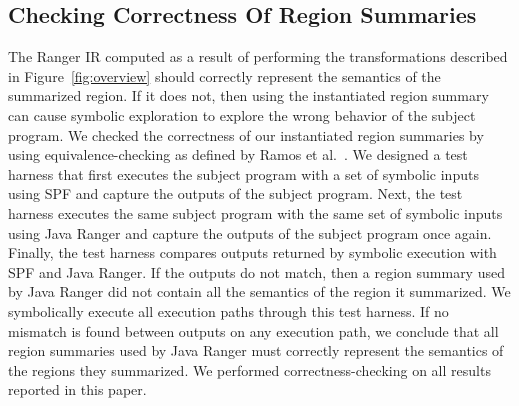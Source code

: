 \subsection{Checking Correctness Of Region Summaries}
The Ranger IR computed as a result of performing the transformations described in Figure~\ref{fig:overview} should
correctly represent the semantics of the summarized region.
%
If it does not, then using the instantiated region summary can cause symbolic exploration to explore the wrong behavior
of the subject program.
%
We checked the correctness of our instantiated region summaries by using equivalence-checking as defined by Ramos et al.~\cite{ramos}.
%
We designed a test harness that first executes the subject program with a set of symbolic inputs using SPF and
capture the outputs of the subject program.
%
Next, the test harness executes the same subject program with the same set of symbolic inputs using Java Ranger and
capture the outputs of the subject program once again.
%
Finally, the test harness compares outputs returned by symbolic execution with SPF and Java Ranger.
%
If the outputs do not match, then a region summary used by Java Ranger did not contain all the semantics
of the region it summarized.
%
We symbolically execute all execution paths through this test harness.
%
If no mismatch is found between outputs on any execution path, we conclude that all region summaries used by Java Ranger
must correctly represent the semantics of the regions they summarized.
%
We performed correctness-checking on all results reported in this paper.
